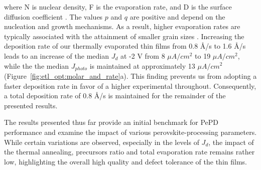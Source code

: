where N is nuclear density, F is the evaporation rate, and D is the surface diffusion coefficient \cite{Dong2023GrowthFilm}. The values $p$ and $q$ are positive and depend on the nucleation and growth mechanisms. As a result, higher evaporation rates are typically associated with the attainment of smaller grain sizes \cite{Dong2023GrowthFilm, Du2022ThermalOutlook, Shin2020ModulationDiodes}. Increasing the deposition rate of our thermally evaporated  thin films from 0.8 \AA/s to 1.6 \AA/s leads to an increase of the median $J_d$ at -2 V from 8 $\mu A/cm^2$ to 19 $\mu A/cm^2$, while the the median $J_{photo}$ is maintained at approximately  13 $\mu A/cm^2$ (Figure~\ref{fig:etl_opt:molar_and_rate}a). This finding prevents us from adopting a faster deposition rate in favor of a higher experimental throughout. Consequently, a total deposition rate of 0.8 \AA/s is maintained for the remainder of the presented results. 




The results presented thus far provide an initial benchmark for PePD performance and examine the impact of various perovskite-processing parameters. While certain variations are observed, especially in the levels of $J_d$, the impact of the thermal annealing, precursors ratio and total evaporation rate remains rather low, highlighting the overall high quality and defect tolerance of the  thin films. 

